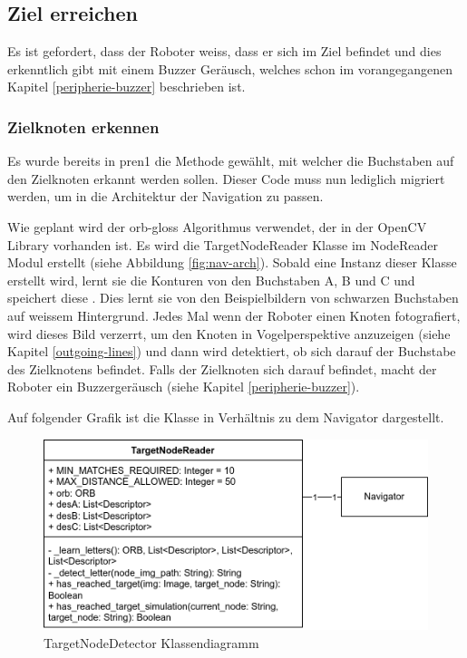 \subsection{Ziel erreichen}

Es ist gefordert, dass der Roboter weiss, dass er sich im Ziel befindet und dies erkenntlich gibt mit einem Buzzer Geräusch, welches schon im vorangegangenen Kapitel \ref{peripherie-buzzer} beschrieben ist.

\subsubsection{Zielknoten erkennen}
\label{detect-target}

Es wurde bereits in \acrshort{pren1} die Methode gewählt, mit welcher die Buchstaben auf den Zielknoten erkannt werden sollen. Dieser Code muss nun lediglich migriert werden, um in die Architektur der Navigation zu passen.

Wie geplant wird der \gls{orb-gloss} Algorithmus verwendet, der in der OpenCV Library vorhanden ist. Es wird die TargetNodeReader Klasse im NodeReader Modul erstellt (siehe Abbildung \ref{fig:nav-arch}). Sobald eine Instanz dieser Klasse erstellt wird, lernt sie die Konturen von den Buchstaben A, B und C und speichert diese .
Dies lernt sie von den Beispielbildern von schwarzen Buchstaben auf weissem Hintergrund.
Jedes Mal wenn der Roboter einen Knoten fotografiert, wird dieses Bild verzerrt, um den Knoten in Vogelperspektive anzuzeigen (siehe Kapitel \ref{outgoing-lines}) und dann wird detektiert, ob sich darauf der Buchstabe des Zielknotens befindet. Falls der Zielknoten sich darauf befindet, macht der Roboter ein Buzzergeräusch (siehe Kapitel \ref{peripherie-buzzer}).

Auf folgender Grafik ist die Klasse in Verhältnis zu dem Navigator dargestellt.

\begin{figure}[H]
\centering
\includegraphics[width=\textwidth]{assets/IT/robot-sw-architecture-target-node-detector.png}
\caption{TargetNodeDetector Klassendiagramm}
\label{fig:target-node-nav}
\end{figure}

